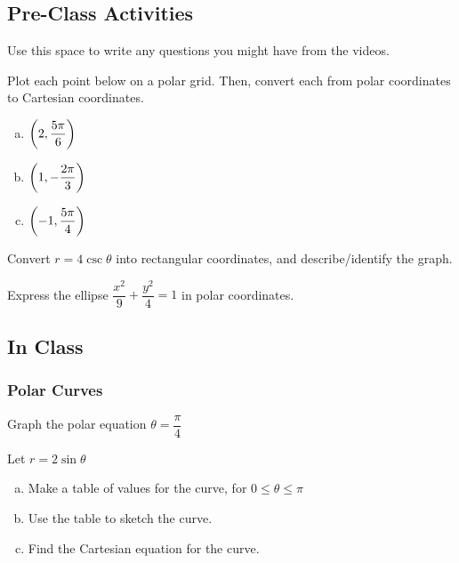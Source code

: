 \documentclass[notes]{subfiles}
\begin{document}
	\subsection*{Pre-Class Activities}
		\begin{ex}
			Use this space to write any questions you might have from the videos.
		\end{ex}
			
		\begin{ex}
			Plot each point below on a polar grid.  Then, convert each from polar coordinates to Cartesian coordinates.
			\begin{enumerate}[(a)]
				\item $\left( 2,\dfrac{5\pi}{6}\right)$
				\item $\left( 1,-\dfrac{2\pi}{3}\right)$
				\item $\left( -1,\dfrac{5\pi}{4}\right)$
			\end{enumerate}
		\end{ex}
			
		\begin{ex}
			Convert $r = 4\csc\theta$ into rectangular coordinates, and describe/identify the graph.
		\end{ex}
			
		\begin{ex}
			Express the ellipse $\dfrac{x^2}{9} + \dfrac{y^2}{4} = 1$ in polar coordinates.
		\end{ex}
			\newpage
			
	\subsection*{In Class}
	\subsubsection*{Polar Curves}	
		\begin{ex}
			Graph the polar equation $\theta = \dfrac{\pi}{4}$
		\end{ex}
			
		\begin{ex}
			Let $r = 2\sin\theta$
			\begin{enumerate}[(a)]
				\item Make a table of values for the curve, for $0\leq\theta\leq\pi$
				\item Use the table to sketch the curve.
				\item Find the Cartesian equation for the curve.
			\end{enumerate}
		\end{ex}
			\newpage
			
\end{document}
